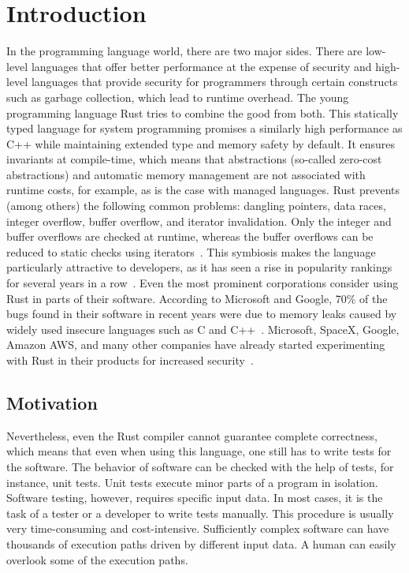 \documentclass[paper=a4,%
  twoside,%
  BCOR4mm,%
  abstract=true,%
  toc=bibliography,%
  chapterprefix=true,%
  toc=bibliographynumbered,%
  open=right,%
  english,%
  pagesize=pdftex]{scrreprt}
\begin{document}
\chapter{Introduction}
\label{chap:introduction}
In the programming language world, there are two major sides. There are low-level languages that offer better performance at the expense of security and high-level languages that provide security for programmers through certain constructs such as garbage collection, which lead to runtime overhead. The young programming language Rust tries to combine the good from both. This statically typed language for system programming promises a similarly high performance as C++ while maintaining extended type and memory safety by default. It ensures invariants at compile-time, which means that abstractions (so-called zero-cost abstractions) and automatic memory management are not associated with runtime costs, for example, as is the case with managed languages. Rust prevents (among others) the following common problems: dangling pointers, data races, integer overflow, buffer overflow, and iterator invalidation. Only the integer and buffer overflows are checked at runtime, whereas the buffer overflows can be reduced to static checks using iterators~\cite{Anderson2016}. This symbiosis makes the language particularly attractive to developers, as it has seen a rise in popularity rankings for several years in a row~\cite{StackOverflow2020}. Even the most prominent corporations consider using Rust in parts of their software. According to Microsoft and Google, 70\% of the bugs found in their software in recent years were due to memory leaks caused by widely used insecure languages such as C and C++~\cite{Microsoft2019MemoryBugs, RustInAndroid}. Microsoft, SpaceX, Google, Amazon AWS, and many other companies have already started experimenting with Rust in their products for increased security~\cite{MicrosoftJoinsRust, AmazonLovesRust, RustInAndroid, GoogleRustFoundation}.

\section{Motivation}
Nevertheless, even the Rust compiler cannot guarantee complete correctness, which means that even when using this language, one still has to write tests for the software. The behavior of software can be checked with the help of tests, for instance, unit tests. Unit tests execute minor parts of a program in isolation. Software testing, however, requires specific input data. In most cases, it is the task of a tester or a developer to write tests manually. This procedure is usually very time-consuming and cost-intensive. Sufficiently complex software can have thousands of execution paths driven by different input data. A human can easily overlook some of the execution paths. 
\end{document}
